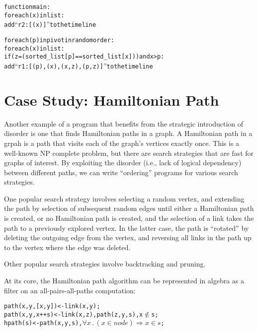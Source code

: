 \begin{alltt}
function main:
   for each (x) in list:
      add ``r2 : [(x)]'' to the timeline

   for each (p) in pivot in random order:
      for each (x) in list:
         if (z = (sorted_list[p] == sorted_list[x])) and x > p:
            add ``r1 : [(p),(x),(x,z),(p,z)]'' to the timeline
\end{alltt}


\section{Case Study: Hamiltonian Path}

Another example of a program that benefits from the strategic introduction of disorder is one that finds Hamiltonian paths in a graph.  A Hamiltonian path in a grpah is a path that visits each of the graph's vertices exactly once.  This is a well-known NP complete problem, but there are search strategies that are fast for graphs of interest.  By exploiting the disorder (i.e., lack of logical dependency) between different paths, we can write ``ordering'' programs for various search strategies.

One popular search strategy involves selecting a random vertex, and extending the path by selection of subsequent random edges until either a Hamiltonian path is created, or no Hamiltonian path is created, and the selection of a link takes the path to a previously explored vertex.  In the latter case, the path is ``rotated'' by deleting the outgoing edge from the vertex, and reversing all links in the path up to the vertex where the edge was deleted.

Other popular search strategies involve backtracking and pruning.


At its core, the Hamiltonian path algorithm can be represented in algebra as a filter on an all-pairs-all-paths computation:

\begin{alltt}
path(x,y,[x,y]) <- link(x,y);
path(x,y,x ++ s) <- link(x,z), path(z,y,s), x \(\not\in\) s;
hpath(s) <- path(x,y,s), \(\forall x \, . \, (x \in node) \Rightarrow x \in s \);
\end{alltt}


